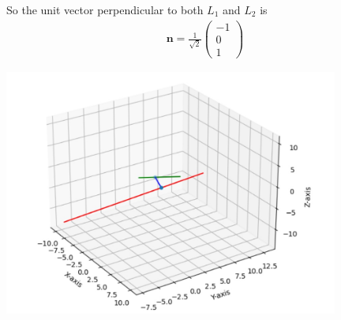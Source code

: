 \documentclass[journal,12pt,twocolumn]{IEEEtran}
\begin{document}
So the unit vector perpendicular to both $L_1$ and $L_2$ is
\begin{align}
    \bm{n}=\frac{1}{\sqrt{2}}\begin{pmatrix}-1\\0\\1\end{pmatrix}
\end{align}

\begin{center}
    \includegraphics[width=11cm]{assignment2.jpg}
\end{center}
\end{document}
